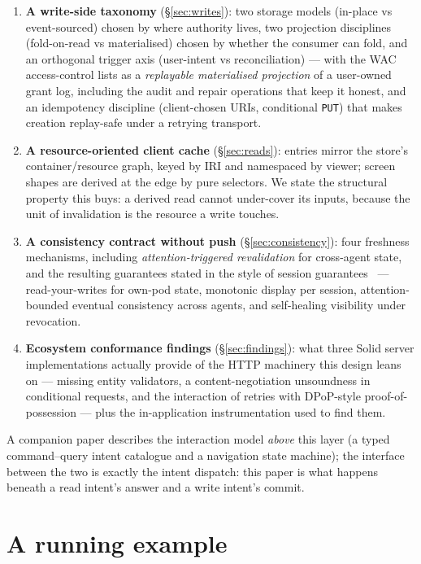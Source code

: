 \documentclass[11pt,a4paper]{article}
\theoremstyle{remark}
\newcommand{\code}[1]{\texttt{#1}}
\begin{document}
\begin{enumerate}
\item \textbf{A write-side taxonomy} (\S\ref{sec:writes}): two storage models
  (in-place vs event-sourced) chosen by where authority lives, two projection
  disciplines (fold-on-read vs materialised) chosen by whether the consumer can
  fold, and an orthogonal trigger axis (user-intent vs reconciliation) --- with
  the WAC access-control lists as a \emph{replayable materialised projection} of
  a user-owned grant log, including the audit and repair operations that keep it
  honest, and an idempotency discipline (client-chosen URIs, conditional
  \code{PUT}) that makes creation replay-safe under a retrying transport.
\item \textbf{A resource-oriented client cache} (\S\ref{sec:reads}): entries
  mirror the store's container/resource graph, keyed by IRI and namespaced by
  viewer; screen shapes are derived at the edge by pure selectors. We state the
  structural property this buys: a derived read cannot under-cover its inputs,
  because the unit of invalidation is the resource a write touches.
\item \textbf{A consistency contract without push} (\S\ref{sec:consistency}):
  four freshness mechanisms, including \emph{attention-triggered revalidation}
  for cross-agent state, and the resulting guarantees stated in the style of
  session guarantees~\cite{terry1994} --- read-your-writes for own-pod state,
  monotonic display per session, attention-bounded eventual consistency across
  agents, and self-healing visibility under revocation.
\item \textbf{Ecosystem conformance findings} (\S\ref{sec:findings}): what three
  Solid server implementations actually provide of the HTTP machinery this
  design leans on --- missing entity validators, a content-negotiation
  unsoundness in conditional requests, and the interaction of retries with
  DPoP-style proof-of-possession --- plus the in-application instrumentation used
  to find them.
\end{enumerate}

A companion paper describes the interaction model \emph{above} this layer (a
typed command--query intent catalogue and a navigation state machine); the
interface between the two is exactly the intent dispatch: this paper is what
happens beneath a read intent's answer and a write intent's commit.

\section{A running example}\label{sec:running}
\end{document}
